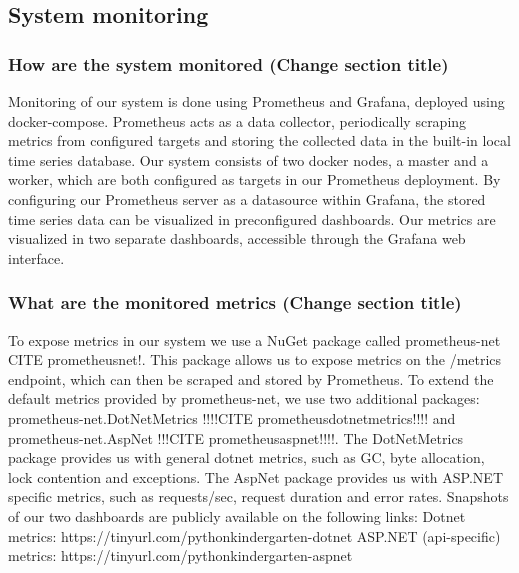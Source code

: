 \subsection{System monitoring}
\subsubsection{How are the system monitored (Change section title)}
Monitoring of our system is done using Prometheus and Grafana, deployed using docker-compose. \newline
Prometheus acts as a data collector, periodically scraping metrics from configured targets and storing the collected data in the built-in local time series database.\newline
Our system consists of two docker nodes, a master and a worker, which are both configured as targets in our Prometheus deployment.\newline
By configuring our Prometheus server as a datasource within Grafana, the stored time series data can be visualized in preconfigured dashboards. Our metrics are visualized in two separate dashboards, accessible through the Grafana web interface.

\subsubsection{What are the monitored metrics (Change section title)}
To expose metrics in our system we use a NuGet package called prometheus-net CITE prometheusnet!.
This package allows us to expose metrics on the /metrics endpoint, which can then be scraped and stored by Prometheus.
\newline
To extend the default metrics provided by prometheus-net, we use two additional packages: 
prometheus-net.DotNetMetrics !!!!CITE prometheusdotnetmetrics!!!! and prometheus-net.AspNet !!!CITE prometheusaspnet!!!!.
\newline
The DotNetMetrics package provides us with general dotnet metrics, such as GC, byte allocation, lock contention and exceptions.
\newline
The AspNet package provides us with ASP.NET specific metrics, such as requests/sec, request duration and error rates.
\newline
\newline
Snapshots of our two dashboards are publicly available on the following links:
\newline
Dotnet metrics: https://tinyurl.com/pythonkindergarten-dotnet
\newline
ASP.NET (api-specific) metrics: https://tinyurl.com/pythonkindergarten-aspnet

